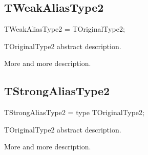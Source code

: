 \documentclass{report}
\begin{document}
\subsection*{TWeakAliasType2}
\begin{list}{}{
\setlength{\itemindent}{0cm}
\setlength{\listparindent}{0cm}
\setlength{\leftmargin}{\evensidemargin}
\addtolength{\leftmargin}{\tmplength}
\settowidth{\labelsep}{X}
\addtolength{\leftmargin}{\labelsep}
\setlength{\labelwidth}{\tmplength}
}
\begin{flushleft}
\item[\textbf{Declaration}\hfill]
\begin{ttfamily}
TWeakAliasType2 = TOriginalType2;\end{ttfamily}


\end{flushleft}
\par
\item[\textbf{Description}]
TOriginalType2 abstract description.\hfill\vspace*{1ex}

 More and more description.

\end{list}
\subsection*{TStrongAliasType2}
\begin{list}{}{
\setlength{\itemindent}{0cm}
\setlength{\listparindent}{0cm}
\setlength{\leftmargin}{\evensidemargin}
\addtolength{\leftmargin}{\tmplength}
\settowidth{\labelsep}{X}
\addtolength{\leftmargin}{\labelsep}
\setlength{\labelwidth}{\tmplength}
}
\begin{flushleft}
\item[\textbf{Declaration}\hfill]
\begin{ttfamily}
TStrongAliasType2 = type TOriginalType2;\end{ttfamily}


\end{flushleft}
\par
\item[\textbf{Description}]
TOriginalType2 abstract description.\hfill\vspace*{1ex}

 More and more description.

\end{list}
\end{document}
